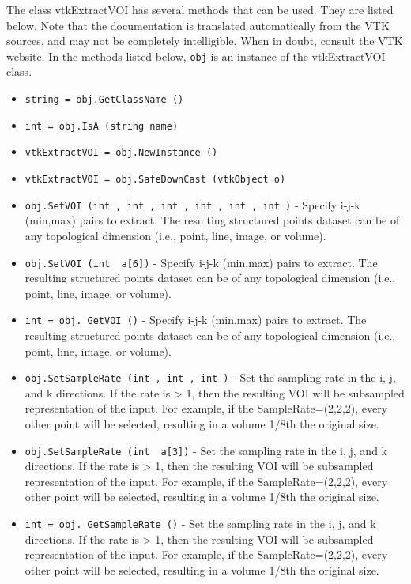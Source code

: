 The class vtkExtractVOI has several methods that can be used.
  They are listed below.
Note that the documentation is translated automatically from the VTK sources,
and may not be completely intelligible.  When in doubt, consult the VTK website.
In the methods listed below, \verb|obj| is an instance of the vtkExtractVOI class.
\begin{itemize}
\item  \verb|string = obj.GetClassName ()|

\item  \verb|int = obj.IsA (string name)|

\item  \verb|vtkExtractVOI = obj.NewInstance ()|

\item  \verb|vtkExtractVOI = obj.SafeDownCast (vtkObject o)|

\item  \verb|obj.SetVOI (int , int , int , int , int , int )| -  Specify i-j-k (min,max) pairs to extract. The resulting structured points
 dataset can be of any topological dimension (i.e., point, line, image, 
 or volume). 

\item  \verb|obj.SetVOI (int  a[6])| -  Specify i-j-k (min,max) pairs to extract. The resulting structured points
 dataset can be of any topological dimension (i.e., point, line, image, 
 or volume). 

\item  \verb|int = obj. GetVOI ()| -  Specify i-j-k (min,max) pairs to extract. The resulting structured points
 dataset can be of any topological dimension (i.e., point, line, image, 
 or volume). 

\item  \verb|obj.SetSampleRate (int , int , int )| -  Set the sampling rate in the i, j, and k directions. If the rate is >
 1, then the resulting VOI will be subsampled representation of the
 input.  For example, if the SampleRate=(2,2,2), every other point will
 be selected, resulting in a volume 1/8th the original size.

\item  \verb|obj.SetSampleRate (int  a[3])| -  Set the sampling rate in the i, j, and k directions. If the rate is >
 1, then the resulting VOI will be subsampled representation of the
 input.  For example, if the SampleRate=(2,2,2), every other point will
 be selected, resulting in a volume 1/8th the original size.

\item  \verb|int = obj. GetSampleRate ()| -  Set the sampling rate in the i, j, and k directions. If the rate is >
 1, then the resulting VOI will be subsampled representation of the
 input.  For example, if the SampleRate=(2,2,2), every other point will
 be selected, resulting in a volume 1/8th the original size.

\end{itemize}
